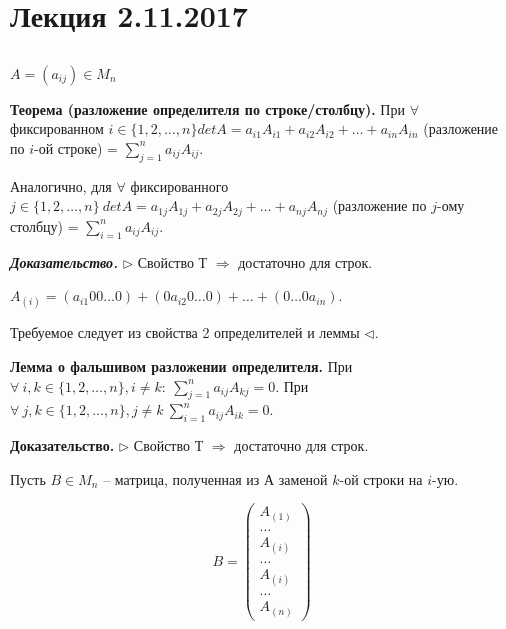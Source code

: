 \section{Лекция 2.11.2017}

\subsection{}

$A = (a_{ij}) \in M_n$

\vspace{\baselineskip}
\textbf{Теорема (разложение определителя по строке/столбцу).} При $\forall$ фиксированном $i \in \{1, 2, \dots, n\} detA = a_{i1}A_{i1} + a_{i2}A_{i2} + \dots + a_{in}A_{in}$ (разложение по $i$-ой строке) = $\sum\limits_{j = 1}^n a_{ij}A_{ij}$.

Аналогично, для $\forall$ фиксированного $j \in \{1, 2, \dots, n\} \ detA = a_{1j}A_{1j} + a_{2j}A_{2j} + \dots + a_{nj}A_{nj}$ (разложение по $j$-ому столбцу) = $\sum\limits_{i = 1}^n a_{ij}A_{ij}$.

\vspace{\baselineskip}
\textbf{\textit{Доказательство.}} $\rhd$ Свойство Т $\Rightarrow$ достаточно для строк. 

$A_{(i)} = (a_{i1} 00 \dots 0) + (0 a_{i2} 0 \dots 0) + \dots + (0 \dots 0 a_{in})$. 

Требуемое следует из свойства 2 определителей и леммы $\lhd$.

\vspace{\baselineskip}
\textbf{Лемма о фальшивом разложении определителя.} При $\forall \ i, k \in \{1, 2, \dots, n\}, i \neq k: \ \sum\limits_{j = 1}^n a_{ij}A_{kj} = 0$. При $\forall \ j, k \in \{1, 2, \dots, n\}, j \neq k \ \sum\limits_{i = 1}^n a_{ij}A_{ik} = 0$.

\vspace{\baselineskip}
\textbf{Доказательство.} $\rhd$ Свойство Т $\Rightarrow$ достаточно для строк.

Пусть $B \in M_n$ -- матрица, полученная из А заменой $k$-ой строки на $i$-ую.

\vspace{\baselineskip}
\[B = \begin{pmatrix} A_{(1)} \\ \dots \\ A_{(i)} \\ \dots \\ A_{(i)} \\ \dots \\ A_{(n)} \end{pmatrix}
\]

